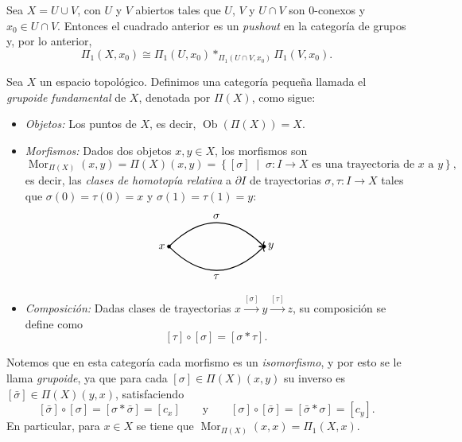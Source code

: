 \begin{teorema}
Sea $X = U \cup V$, con $U$ y $V$ abiertos tales que $U$, $V$ y $U \cap V$ son $0$-conexos y $x_0 \in U \cap V$. Entonces el cuadrado anterior es un \textit{pushout} en la categoría de grupos y, por lo anterior,
\[
\Pi_1(X, x_0) \cong \Pi_1(U, x_0) {\ast}_{\Pi_1(U \cap V, x_0)} \Pi_1(V, x_0).
\]
\end{teorema}

\begin{definicion}
Sea $X$ un espacio topológico. Definimos una categoría pequeña llamada el \textit{grupoide fundamental} de $X$, denotada por $\Pi(X)$, como sigue:
\begin{itemize}
    \item \textit{Objetos:} Los puntos de $X$, es decir, $\operatorname{Ob}(\Pi(X)) = X$.
    \item \textit{Morfismos:} Dados dos objetos $x, y \in X$, los morfismos son
    \[
    \operatorname{Mor}_{\Pi(X)}(x, y) = \Pi(X)(x, y) = \left\{ [\sigma] \;\middle|\; \sigma \colon I \to X \text{ es una trayectoria de } x \text{ a } y \right\},
    \]
    es decir, las \textit{clases de homotopía relativa} a $\partial I$ de trayectorias $\sigma, \tau \colon I \to X$ tales que $\sigma(0) = \tau(0) = x$ y $\sigma(1) = \tau(1) = y$:
    \[
    \begin{tikzpicture}[baseline=-0.5ex]
        \filldraw (0,0) circle (1.5pt) node[left] {$x$};
        \filldraw (3,0) circle (1.5pt) node[right] {$y$};
        \draw[->, thick] (0,0) .. controls (1, 1) and (2, 1) .. node[above] {$\sigma$} (3,0);
        \draw[->, thick] (0,0) .. controls (1, -1) and (2, -1) .. node[below] {$\tau$} (3,0);
    \end{tikzpicture}
    \]
    \item \textit{Composición:} Dadas clases de trayectorias $x \xrightarrow{[\sigma]} y \xrightarrow{[\tau]} z$, su composición se define como
    \[
    [\tau] \circ [\sigma] = [\sigma \ast \tau].
    \]
\end{itemize}
Notemos que en esta categoría cada morfismo es un \textit{isomorfismo}, y por esto se le llama \textit{grupoide}, ya que para cada $[\sigma] \in \Pi(X)(x, y)$ su inverso es $[\bar{\sigma}] \in \Pi(X)(y, x)$, satisfaciendo
\[
[\bar{\sigma}] \circ [\sigma] = [\sigma \ast \bar{\sigma}] = [c_x] \qquad \text{y} \qquad [\sigma] \circ [\bar{\sigma}] = [\bar{\sigma} \ast \sigma] = [c_y].
\]
En particular, para $x \in X$ se tiene que $\operatorname{Mor}_{\Pi(X)}(x, x) = \Pi_1(X, x)$.
\end{definicion}

